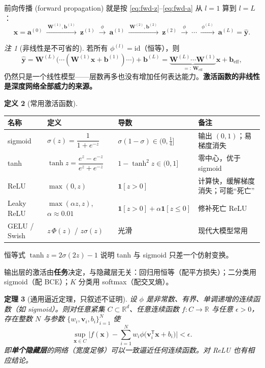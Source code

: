 \documentclass[UTF8,a4paper,11pt]{ctexart}
\theoremstyle{definition}
\newtheorem{definition}{定义}[section]
\theoremstyle{plain}
\newtheorem{theorem}[definition]{定理}
\theoremstyle{remark}
\newtheorem{remark}[definition]{注}
\newcommand{\R}{\mathbb{R}}
\newcommand{\T}{^{\mathsf{T}}}
\newcommand{\eng}[1]{\textup{(#1)}}
\begin{document}
前向传播 \eng{forward propagation} 就是按 \eqref{eq:fwd-z}--\eqref{eq:fwd-a} 从 $l=1$ 算到 $l=L$：
\[
  \bm{x}=\bm{a}^{(0)}
  \ \xrightarrow{\ \bm{W}^{(1)},\bm{b}^{(1)}\ }\ \bm{z}^{(1)}
  \ \xrightarrow{\ \phi\ }\ \bm{a}^{(1)}
  \ \xrightarrow{\ \bm{W}^{(2)},\bm{b}^{(2)}\ }\ \bm{z}^{(2)}
  \ \xrightarrow{\ \phi\ }\ \cdots
  \ \xrightarrow{\ \phi^{(L)}\ }\ \bm{a}^{(L)}=\hat{\bm{y}} .
\]

\begin{remark}[非线性是不可省的]\label{rmk:need-nonlinear}
若所有 $\phi^{(l)}=\mathrm{id}$（恒等），则
\[
  \hat{\bm{y}}=\bm{W}^{(L)}\big(\cdots(\bm{W}^{(1)}\bm{x}+\bm{b}^{(1)})\cdots\big)+\bm{b}^{(L)}
  =\underbrace{\bm{W}^{(L)}\cdots\bm{W}^{(1)}}_{=:\,\bm{W}_{\text{eff}}}\bm{x}+\bm{b}_{\text{eff}},
\]
仍然只是一个线性模型——层数再多也没有增加任何表达能力。\textbf{激活函数的非线性是深度网络全部威力的来源。}
\end{remark}

\begin{definition}[常用激活函数]\label{def:activations}
\begin{center}
\small
\setlength{\tabcolsep}{3pt}
\begin{tabular}{@{}llll@{}}
\toprule
名称 & 定义 & 导数 & 备注\\
\midrule
sigmoid & $\sigma(z)=\dfrac{1}{1+e^{-z}}$ & $\sigma(1-\sigma)\in(0,\tfrac14]$ & 输出 $(0,1)$；易梯度消失\\
tanh & $\tanh z=\dfrac{e^{z}-e^{-z}}{e^{z}+e^{-z}}$ & $1-\tanh^2z\in(0,1]$ & 零中心，优于 sigmoid\\
ReLU & $\max(0,z)$ & $\bm{1}[z>0]$ & 计算快，缓解梯度消失；可能“死亡”\\
Leaky ReLU & $\max(\alpha z,z)$, $\alpha\!\approx\!0.01$ & $\bm{1}[z>0]+\alpha\bm{1}[z\le0]$ & 修补死亡 ReLU\\
GELU / Swish & $z\,\Phi(z)$ / $z\sigma(z)$ & 光滑 & 现代大模型常用\\
\bottomrule
\end{tabular}
\end{center}
恒等式 $\tanh z=2\sigma(2z)-1$ 说明 tanh 与 sigmoid 只差一个仿射变换。
\end{definition}

输出层的激活由\textbf{任务}决定，与隐藏层无关：回归用恒等（配平方损失）；二分类用 sigmoid（配 BCE）；$K$ 分类用 softmax（配交叉熵）。

\begin{theorem}[通用逼近定理，只叙述不证明]\label{thm:uat}
设 $\phi$ 是非常数、有界、单调递增的连续函数（如 sigmoid）。则对任意紧集 $C\subset\R^d$、任意连续函数 $f:C\to\R$ 与任意 $\epsilon>0$，存在整数 $N$ 与参数 $\{w_i,\bm{v}_i,b_i\}_{i=1}^{N}$ 使
\[
  \sup_{\bm{x}\in C}\Big|f(\bm{x})-\sum_{i=1}^{N}w_i\phi\big(\bm{v}_i\T\bm{x}+b_i\big)\Big|<\epsilon .
\]
即\textbf{单个隐藏层}的网络（宽度足够）可以一致逼近任何连续函数。对 ReLU 也有相应结论。
\end{theorem}
\end{document}
